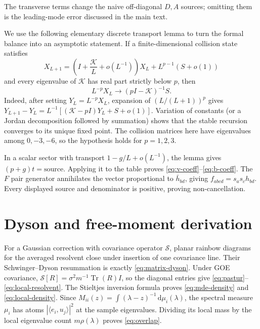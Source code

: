 \documentclass{article}
\newcommand{\Tr}{\operatorname{Tr}}
\newcommand{\dd}{\,\mathrm d}
\begin{document}
The transverse terms change the naive off-diagonal \(D,A\) sources; omitting
them is the leading-mode error discussed in the main text.

We use the following elementary discrete transport lemma to turn the formal
balance into an asymptotic statement.  If a finite-dimensional collision
state satisfies
\begin{equation}
X_{L+1}=\left(I+\frac{\mathcal K}{L}+o(L^{-1})\right)X_L
+L^{p-1}(S+o(1))
\label{eq:discrete-transport-lemma}
\end{equation}
and every eigenvalue of \(\mathcal K\) has real part strictly below \(p\),
then
\begin{equation}
L^{-p}X_L\longrightarrow(pI-\mathcal K)^{-1}S.
\label{eq:discrete-transport-limit}
\end{equation}
Indeed, after setting \(Y_L=L^{-p}X_L\), expansion of
\((L/(L+1))^p\) gives
\(Y_{L+1}-Y_L=L^{-1}[(\mathcal K-pI)Y_L+S+o(1)]\).
Variation of constants (or a Jordan decomposition followed by summation)
shows that the stable recursion converges to its unique fixed point.  The
collision matrices here have eigenvalues among \(0,-3,-6\), so the
hypothesis holds for \(p=1,2,3\).

In a scalar sector with transport \(1-g/L+o(L^{-1})\), the lemma gives
\((p+g)t=\text{source}\).  Applying it to the table proves
\eqref{eq:v-coeff}--\eqref{eq:b-coeff}.  The \(F\) pair generator annihilates
the vector proportional to \(\bar h_{bd}\), giving
\(f_{abcd}=s_as_ch_{bd}\).  Every displayed source and denominator is
positive, proving non-cancellation.

\section{Dyson and free-moment derivation}
\label{app:dyson-proof}

For a Gaussian correction with covariance operator \(\mathcal S\), planar
rainbow diagrams for the averaged resolvent close under insertion of one
covariance line.  Their Schwinger--Dyson resummation is exactly
\eqref{eq:matrix-dyson}.  Under GOE covariance,
\(\mathcal S[R]=\sigma^2m^{-1}\Tr(R)I\), so the diagonal entries give
\eqref{eq:pastur}--\eqref{eq:local-resolvent}.  The Stieltjes inversion formula
proves \eqref{eq:mde-density} and \eqref{eq:local-density}.  Since
\(M_{ii}(z)=\int(\lambda-z)^{-1}\dd\mu_i(\lambda)\), the spectral measure
\(\mu_i\) has atoms \(|\langle e_i,u_j\rangle|^2\) at the sample eigenvalues.
Dividing its local mass by the local eigenvalue count \(m\rho(\lambda)\)
proves \eqref{eq:overlap}.
\end{document}

